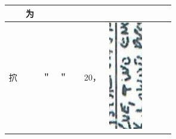 \documentclass[10pt]{article}
\begin{document}
\begin{center}
\begin{tabular}{|c|c|c|c|c|c|c|c|c|c|}
 & 为 &  &  &  \\
\hline
㧒 &  & ＂ & ＂ &  & 20， & \includegraphics[max width=\textwidth]{2025_02_27_dd68c3d38de88f0516d9g-096(4)}

\end{tabular}
\end{center}
\end{document}
